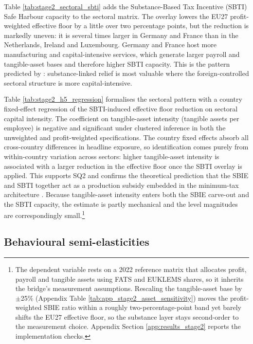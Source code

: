 \documentclass[11pt,a4paper]{article}
\begin{document}


Table \ref{tab:stage2_sectoral_sbti} adds the Substance-Based Tax Incentive (SBTI) Safe Harbour capacity to the sectoral matrix. The overlay lowers the EU27 profit-weighted effective floor by a little over two percentage points, but the reduction is markedly uneven: it is several times larger in Germany and France than in the Netherlands, Ireland and Luxembourg. Germany and France host more manufacturing and capital-intensive services, which generate larger payroll and tangible-asset bases and therefore higher SBTI capacity. This is the pattern predicted by \citet{schjelderup2024}: substance-linked relief is most valuable where the foreign-controlled sectoral structure is more capital-intensive. 



Table \ref{tab:stage2_h5_regression} formalises the sectoral pattern with a country fixed-effect regression of the SBTI-induced effective floor reduction on sectoral capital intensity. The coefficient on tangible-asset intensity (tangible assets per employee) is negative and significant under clustered inference in both the unweighted and profit-weighted specifications. The country fixed effects absorb all cross-country differences in headline exposure, so identification comes purely from within-country variation across sectors: higher tangible-asset intensity is associated with a larger reduction in the effective floor once the SBTI overlay is applied. This supports SQ2 and confirms the theoretical prediction that the SBIE and SBTI together act as a production subsidy embedded in the minimum-tax architecture \citep{schjelderup2024}. Because tangible-asset intensity enters both the SBIE carve-out and the SBTI capacity, the estimate is partly mechanical and the level magnitudes are correspondingly small.\footnote{The dependent variable rests on a 2022 reference matrix that allocates profit, payroll and tangible assets using FATS and EUKLEMS shares, so it inherits the bridge's measurement assumptions. Rescaling the tangible-asset base by $\pm$25\% (Appendix Table \ref{tab:app_stage2_asset_sensitivity}) moves the profit-weighted SBIE ratio within a roughly two-percentage-point band yet barely shifts the EU27 effective floor, so the substance layer stays second-order to the measurement choice. Appendix Section \ref{app:results_stage2} reports the implementation checks.} 

\subsection{Behavioural semi-elasticities}\label{sec:results_stage3}
\end{document}
